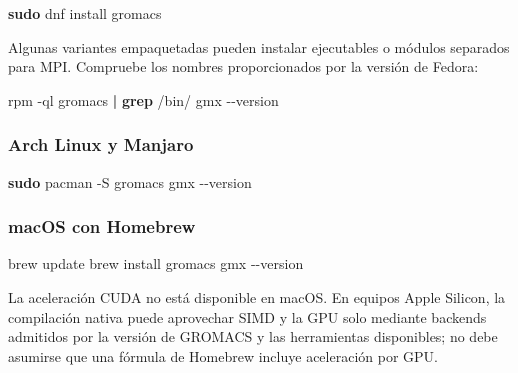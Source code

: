 \documentclass[
  spanish,
  11pt,
  a4paper]{article}
\newenvironment{Shaded}{\begin{snugshade}}{\end{snugshade}}
\newcommand{\AttributeTok}[1]{\textcolor[rgb]{0.13,0.29,0.53}{#1}}
\newcommand{\ExtensionTok}[1]{#1}
\newcommand{\FunctionTok}[1]{\textcolor[rgb]{0.13,0.29,0.53}{\textbf{#1}}}
\newcommand{\KeywordTok}[1]{\textcolor[rgb]{0.13,0.29,0.53}{\textbf{#1}}}
\newcommand{\NormalTok}[1]{#1}
\begin{document}
\begin{Shaded}
\begin{Highlighting}[]
\FunctionTok{sudo}\NormalTok{ dnf install gromacs}
\end{Highlighting}
\end{Shaded}

Algunas variantes empaquetadas pueden instalar ejecutables o módulos
separados para MPI. Compruebe los nombres proporcionados por la versión
de Fedora:

\begin{Shaded}
\begin{Highlighting}[]
\ExtensionTok{rpm} \AttributeTok{{-}ql}\NormalTok{ gromacs }\KeywordTok{|} \FunctionTok{grep}\NormalTok{ /bin/}
\ExtensionTok{gmx} \AttributeTok{{-}{-}version}
\end{Highlighting}
\end{Shaded}

\subsubsection{Arch Linux y Manjaro}\label{arch-linux-y-manjaro}

\begin{Shaded}
\begin{Highlighting}[]
\FunctionTok{sudo}\NormalTok{ pacman }\AttributeTok{{-}S}\NormalTok{ gromacs}
\ExtensionTok{gmx} \AttributeTok{{-}{-}version}
\end{Highlighting}
\end{Shaded}

\subsubsection{macOS con Homebrew}\label{macos-con-homebrew}

\begin{Shaded}
\begin{Highlighting}[]
\ExtensionTok{brew}\NormalTok{ update}
\ExtensionTok{brew}\NormalTok{ install gromacs}
\ExtensionTok{gmx} \AttributeTok{{-}{-}version}
\end{Highlighting}
\end{Shaded}

La aceleración CUDA no está disponible en macOS. En equipos Apple
Silicon, la compilación nativa puede aprovechar SIMD y la GPU solo
mediante backends admitidos por la versión de GROMACS y las herramientas
disponibles; no debe asumirse que una fórmula de Homebrew incluye
aceleración por GPU.
\end{document}
